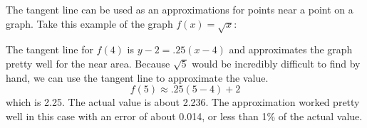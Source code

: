 \documentclass[../revisedmain.tex]{subfiles}
\begin{document}
The tangent line can be used as an approximations for points near a point on a graph. Take this example of the graph $f(x)=\sqrt{x}$:
	\begin{center}
		\end{center}
		The tangent line for $f(4)$ is $y-2=.25(x-4)$ and approximates the graph pretty well for the near area. Because $\sqrt{5}$ would be incredibly difficult to find by hand, we can use the tangent line to approximate the value. $$f(5) \approx .25(5-4)+2$$ which is 2.25. The actual value is about 2.236. The approximation worked pretty well in this case with an error of about 0.014, or less than 1\% of the actual value.\\
\end{document}
